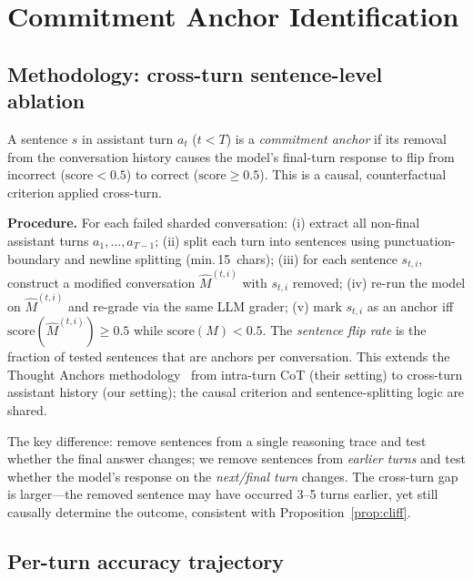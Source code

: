 \documentclass{article}
\begin{document}
\section{Commitment Anchor Identification}
\label{app:anchor-id}

\subsection{Methodology: cross-turn sentence-level ablation}

A sentence $s$ in assistant turn $a_t$ ($t < T$) is a \emph{commitment anchor} if its removal from the conversation history causes the model's final-turn response to flip from incorrect ($\text{score} < 0.5$) to correct ($\text{score} \geq 0.5$). This is a causal, counterfactual criterion applied cross-turn.

\textbf{Procedure.} For each failed sharded conversation: (i) extract all non-final assistant turns $a_1, \ldots, a_{T-1}$; (ii) split each turn into sentences using punctuation-boundary and newline splitting (min.\,15~chars); (iii) for each sentence $s_{t,i}$, construct a modified conversation $\hat{M}^{(t,i)}$ with $s_{t,i}$ removed; (iv) re-run the model on $\hat{M}^{(t,i)}$ and re-grade via the same LLM grader; (v) mark $s_{t,i}$ as an anchor iff $\text{score}(\hat{M}^{(t,i)}) \geq 0.5$ while $\text{score}(M) < 0.5$. The \emph{sentence flip rate} is the fraction of tested sentences that are anchors per conversation. This extends the Thought Anchors methodology~\citep{thoughtanchors2025} from intra-turn CoT (their setting) to cross-turn assistant history (our setting); the causal criterion and sentence-splitting logic are shared.

The key difference: \citet{thoughtanchors2025} remove sentences from a single reasoning trace and test whether the final answer changes; we remove sentences from \emph{earlier turns} and test whether the model's response on the \emph{next/final turn} changes. The cross-turn gap is larger---the removed sentence may have occurred 3--5 turns earlier, yet still causally determine the outcome, consistent with Proposition~\ref{prop:cliff}.

\subsection{Per-turn accuracy trajectory}
\end{document}
